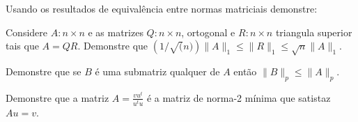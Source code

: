 \documentclass[a4paper,12pt, leqno, answers]{exam}
\newcommand{\cond}{\text{cond}}
\begin{document}
\begin{questions}

    \question Usando os resultados de equival\^{e}ncia entre normas matriciais demonstre:

    \question Considere $A: n \times n$ e as matrizes $Q: n \times n$, ortogonal e $R: n \times n$ triangula superior tais que $A = QR$. Demonstre que $\left( 1 / \sqrt(n) \right) \| A \|_1 \leq \| R \|_1 \leq \sqrt{n} \| A \|_1$.
    \begin{solution}
        
    \end{solution}

    \question Demonstre que se $B$ \'{e} uma submatriz qualquer de $A$ ent\~{a}o $\| B \|_p \leq \| A \|_p$.
    \begin{solution}
        
    \end{solution}

    \question Demonstre que a matriz $A = \frac{v u^t}{u^t u}$ \'{e} a matriz de norma-2 m\'{i}nima que satistaz $A u = v$.
    \begin{solution}
        
    \end{solution}
\end{questions}


\end{document}
